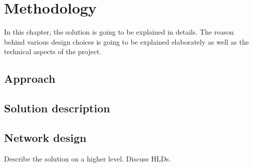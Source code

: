 
\chapter{Methodology}
In this chapter, the solution is going to be explained in details. The reason behind various design choices is going to be explained elaborately as well as the technical aspects of the project.

\section{Approach}


\section{Solution description}


\section{Network design}


Describe the solution on a higher level. Discuss HLDs.